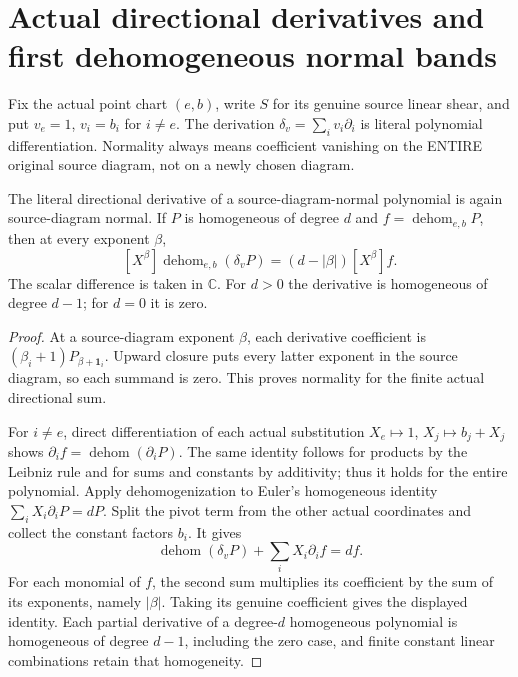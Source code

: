 \section{Actual directional derivatives and first dehomogeneous normal bands}

Fix the actual point chart $(e,b)$, write $S$ for its genuine source
linear shear, and put $v_e=1$, $v_i=b_i$ for $i\ne e$.
The derivation $\delta_v=\sum_i v_i\partial_i$ is literal polynomial
differentiation. Normality always means coefficient vanishing on the
ENTIRE original source diagram, not on a newly chosen diagram.

\begin{theorem}
\label{hir:actual-directional-normal-polynomial-dehom-euler}
\leanok
The literal directional derivative of a source-diagram-normal polynomial
is again source-diagram normal. If $P$ is homogeneous of degree $d$ and
$f=\operatorname{dehom}_{e,b}P$, then at every exponent $\beta$,
\[
 [X^\beta]\operatorname{dehom}_{e,b}(\delta_vP)
   =(d-|\beta|)[X^\beta]f.
\]
The scalar difference is taken in $\mathbb C$. For $d>0$ the derivative is homogeneous of degree $d-1$;
for $d=0$ it is zero.
\end{theorem}
\begin{proof}
At a source-diagram exponent $\beta$, each derivative coefficient is
$(\beta_i+1)P_{\beta+\mathbf1_i}$. Upward closure puts every latter
exponent in the source diagram, so each summand is zero. This proves
normality for the finite actual directional sum.

For $i\ne e$, direct differentiation of each actual substitution
$X_e\mapsto1$, $X_j\mapsto b_j+X_j$ shows
$\partial_i f=\operatorname{dehom}(\partial_iP)$.
The same identity follows for products by the Leibniz rule and for sums
and constants by additivity; thus it holds for the entire polynomial.
Apply dehomogenization to Euler's homogeneous identity
$\sum_i X_i\partial_iP=dP$. Split the pivot term from the other
actual coordinates and collect the constant factors $b_i$. It gives
\[
 \operatorname{dehom}(\delta_vP)+\sum_i X_i\partial_i f=df.
\]
For each monomial of $f$, the second sum multiplies its coefficient by
the sum of its exponents, namely $|\beta|$. Taking its genuine
coefficient gives the displayed identity. Each partial derivative of a
degree-$d$ homogeneous polynomial is homogeneous of degree $d-1$,
including the zero case, and finite constant linear combinations retain
that homogeneity.
\end{proof}

